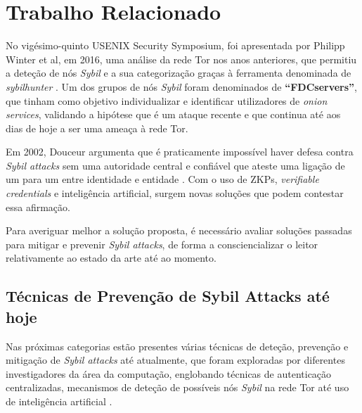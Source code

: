 
%

\makeatletter
\newcommand{\ntifpkgloaded}{%
  \@ifpackageloaded%
}
\makeatother

\chapter{Trabalho Relacionado}
\label{cha:trabalho_relacionado}

No vigésimo-quinto USENIX Security Symposium, foi apresentada por Philipp Winter et al, em 2016, uma análise da rede Tor nos anos anteriores, que permitiu a deteção de nós \textit{Sybil} e a sua categorização graças à ferramenta denominada de \textit{sybilhunter} \cite{winter2016identifying}. Um dos grupos de nós \textit{Sybil} foram denominados de \textbf{“FDCservers”}, que tinham como objetivo individualizar e identificar utilizadores de \textit{onion services}, validando a hipótese que é um ataque recente e que continua até aos dias de hoje a ser uma ameaça à rede Tor.

Em 2002, Douceur argumenta que é praticamente impossível haver defesa contra \textit{Sybil attacks} sem uma autoridade central e confiável que ateste uma ligação de um para um entre identidade e entidade \cite{douceur2002sybil}. Com o uso de ZKPs, \textit{verifiable credentials} e inteligência artificial, surgem novas soluções que podem contestar essa afirmação.

Para averiguar melhor a solução proposta, é necessário avaliar soluções passadas para mitigar e prevenir \textit{Sybil attacks}, de forma a consciencializar o leitor relativamente ao estado da arte até ao momento.

\section{Técnicas de Prevenção de Sybil Attacks até hoje}
\label{sec:tecnicas_prevencao_sybils}

Nas próximas categorias estão presentes várias técnicas de deteção, prevenção e mitigação de \textit{Sybil attacks} até atualmente, que foram exploradas por diferentes investigadores da área da computação, englobando técnicas de autenticação centralizadas, mecanismos de deteção de possíveis nós \textit{Sybil} na rede Tor até uso de inteligência artificial \cite{levine2006survey}.

